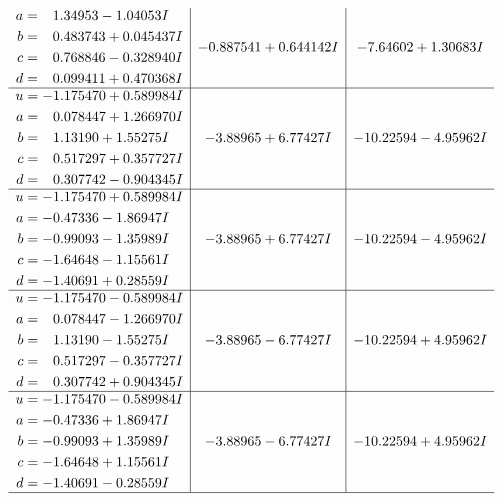 \documentclass[1p]{elsarticle_modified}
\theoremstyle{definition}
\begin{document}
$$\begin{array}{c|c|c}
\begin{aligned}
a &= \phantom{-}1.34953 - 1.04053 I \\
b &= \phantom{-}0.483743 + 0.045437 I \\
c &= \phantom{-}0.768846 - 0.328940 I \\
d &= \phantom{-}0.099411 + 0.470368 I\end{aligned}
 & -0.887541 + 0.644142 I & -7.64602 + 1.30683 I \\ \hline\begin{aligned}
u &= -1.175470 + 0.589984 I \\
a &= \phantom{-}0.078447 + 1.266970 I \\
b &= \phantom{-}1.13190 + 1.55275 I \\
c &= \phantom{-}0.517297 + 0.357727 I \\
d &= \phantom{-}0.307742 - 0.904345 I\end{aligned}
 & -3.88965 + 6.77427 I & -10.22594 - 4.95962 I \\ \hline\begin{aligned}
u &= -1.175470 + 0.589984 I \\
a &= -0.47336 - 1.86947 I \\
b &= -0.99093 - 1.35989 I \\
c &= -1.64648 - 1.15561 I \\
d &= -1.40691 + 0.28559 I\end{aligned}
 & -3.88965 + 6.77427 I & -10.22594 - 4.95962 I \\ \hline\begin{aligned}
u &= -1.175470 - 0.589984 I \\
a &= \phantom{-}0.078447 - 1.266970 I \\
b &= \phantom{-}1.13190 - 1.55275 I \\
c &= \phantom{-}0.517297 - 0.357727 I \\
d &= \phantom{-}0.307742 + 0.904345 I\end{aligned}
 & -3.88965 - 6.77427 I & -10.22594 + 4.95962 I \\ \hline\begin{aligned}
u &= -1.175470 - 0.589984 I \\
a &= -0.47336 + 1.86947 I \\
b &= -0.99093 + 1.35989 I \\
c &= -1.64648 + 1.15561 I \\
d &= -1.40691 - 0.28559 I\end{aligned}
 & -3.88965 - 6.77427 I & -10.22594 + 4.95962 I\\
 \hline 
 \end{array}$$\newpage$$\begin{array}{c|c|c}  

\end{array}$$
\end{document}
